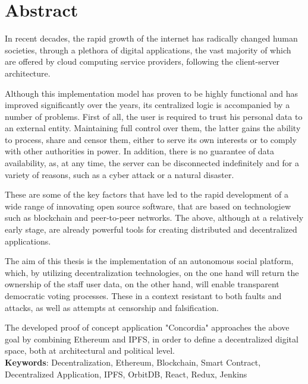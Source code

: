 \chapter*{Abstract}

In recent decades, the rapid growth of the internet has radically changed human
societies, through a plethora of digital applications, the vast majority of which are offered by cloud computing service providers, following the client-server architecture.

Although this implementation model has proven to be highly functional and has improved significantly over the years, its centralized logic is accompanied by a number of problems. First of all, the user is required to trust his personal data to an external entity. Maintaining full control over them, the latter gains the ability to process, share and censor them, either to serve its own interests or to comply with other authorities in power. In addition, there is no guarantee of data availability, as, at any time, the server can be disconnected indefinitely and for a variety of reasons, such as a cyber attack or a natural disaster.

These are some of the key factors that have led to the rapid development of a wide range of innovating open source software, that are based on technologiew such as blockchain and peer-to-peer networks. The above, although at a relatively early stage, are already powerful tools for creating distributed and decentralized applications.

The aim of this thesis is the implementation of an autonomous social platform,
which, by utilizing decentralization technologies, on the one hand will return the ownership of the staff
user data, on the other hand, will enable transparent democratic voting processes. These in a context resistant to both faults and attacks, as well as attempts at censorship and falsification.

The developed proof of concept application "Concordia" approaches the above goal by combining Ethereum and IPFS, in order to define a decentralized digital space, both at architectural and political level. 
\\[2\baselineskip]
\textbf {Keywords}: Decentralization, Ethereum, Blockchain, Smart Contract, Decentralized Application, IPFS, OrbitDB, React, Redux, Jenkins 